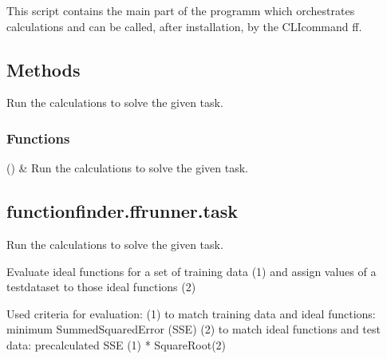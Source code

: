 \documentclass[letterpaper,10pt,english]{sphinxmanual}
\begin{document}
\sphinxAtStartPar
This script contains the main part of the programm which orchestrates
calculations and can be called, after installation, by the CLI\sphinxhyphen{}command ff.


\subsection{Methods}
\label{\detokenize{_autosummary/functionfinder.ffrunner:methods}}\begin{description}
\sphinxAtStartPar
Run the calculations to solve the given task.

\end{description}
\subsubsection*{Functions}


\begin{savenotes}\sphinxattablestart
\sphinxthistablewithglobalstyle
\sphinxthistablewithnovlinesstyle
\centering
\begin{tabulary}{\linewidth}[t]{}
\sphinxtoprule
\sphinxtableatstartofbodyhook
\sphinxAtStartPar
{\hyperref[\detokenize{_autosummary/functionfinder.ffrunner.task:functionfinder.ffrunner.task}]{}}()
&
\sphinxAtStartPar
Run the calculations to solve the given task.
\\
\sphinxbottomrule
\end{tabulary}
\sphinxtableafterendhook\par
\sphinxattableend\end{savenotes}

\sphinxstepscope


\subsection{functionfinder.ffrunner.task}
\label{\detokenize{_autosummary/functionfinder.ffrunner.task:functionfinder-ffrunner-task}}\label{\detokenize{_autosummary/functionfinder.ffrunner.task::doc}}

\begin{fulllineitems}
\label{\detokenize{_autosummary/functionfinder.ffrunner.task:functionfinder.ffrunner.task}}
\pysigstartsignatures
{}
\pysigstopsignatures
\sphinxAtStartPar
Run the calculations to solve the given task.

\sphinxAtStartPar
Evaluate ideal functions for a set of training data (1) and assign
values of a test\sphinxhyphen{}dataset to those ideal functions (2)

\sphinxAtStartPar
Used criteria for evaluation:
(1) to match training data and ideal functions:
minimum SummedSquaredError (SSE)
(2) to match ideal functions and test data:
precalculated SSE (1) * SquareRoot(2)

\end{fulllineitems}
\end{document}

